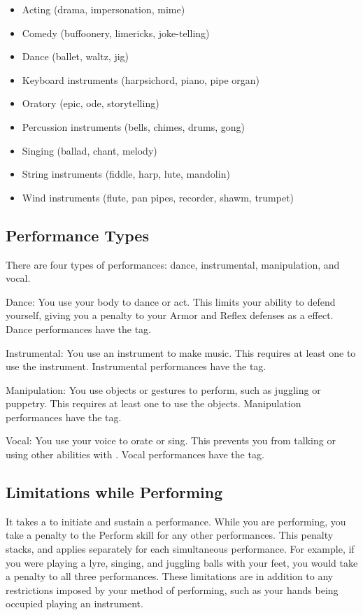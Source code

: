   \begin{itemize}
    \item Acting (drama, impersonation, mime)
    \item Comedy (buffoonery, limericks, joke-telling)
    \item Dance (ballet, waltz, jig)
    \item Keyboard instruments (harpsichord, piano, pipe organ)
    \item Oratory (epic, ode, storytelling)
    \item Percussion instruments (bells, chimes, drums, gong)
    \item Singing (ballad, chant, melody)
    \item String instruments (fiddle, harp, lute, mandolin)
    \item Wind instruments (flute, pan pipes, recorder, shawm, trumpet)
  \end{itemize}

  \subsection{Performance Types}
    There are four types of performances: dance, instrumental, manipulation, and vocal.
    \begin{raggeditemize}
      \item Dance: You use your body to dance or act. This limits your ability to defend yourself, giving you a  penalty to your Armor and Reflex defenses as a \atSwift effect. Dance performances have the \atVisual tag.
      \item Instrumental: You use an instrument to make music. This requires at least one  to use the instrument. Instrumental performances have the \atAuditory tag.
      \item Manipulation: You use objects or gestures to perform, such as juggling or puppetry. This requires at least one  to use the objects. Manipulation performances have the \atVisual tag.
      \item Vocal: You use your voice to orate or sing. This prevents you from talking or using other abilities with . Vocal performances have the \atAuditory tag.
    \end{raggeditemize}

  \subsection{Limitations while Performing}
    It takes a  to initiate and sustain a performance.
    While you are performing, you take a  penalty to the Perform skill for any other performances.
    This penalty stacks, and applies separately for each simultaneous performance.
    For example, if you were playing a lyre, singing, and juggling balls with your feet, you would take a  penalty to all three performances.
    These limitations are in addition to any restrictions imposed by your method of performing, such as your hands being occupied playing an instrument.

